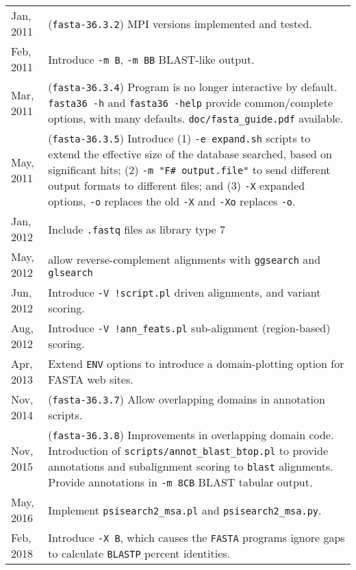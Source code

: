 \begin{longtable}{p{0.75 in}p{5.25 in}}
Jan, 2011 & (\texttt{fasta-36.3.2}) MPI versions implemented and tested.\\[1ex]

Feb, 2011 & Introduce \texttt{-m B}, \texttt{-m BB} BLAST-like output.\\[1.0ex]

Mar, 2011 & (\texttt{fasta-36.3.4}) Program is no longer interactive by
default. \texttt{fasta36 -h} and \texttt{fasta36 -help} provide
common/complete options, with many defaults. \texttt{doc/fasta\_guide.pdf} available.\\[1.0ex]

May, 2011 & (\texttt{fasta-36.3.5}) Introduce (1) \texttt{-e
  expand.sh} scripts to extend the effective size of the database
searched, based on significant hits; (2) \texttt{-m "F\# output.file"}
to send different output formats to different files; and (3)
\texttt{-X} expanded options, \texttt{-o} replaces the old \texttt{-X}
and \texttt{-Xo} replaces \texttt{-o}. \\[1.0ex]

Jan, 2012 & Include \texttt{.fastq} files as library type 7 \\[1.0ex]

May, 2012 & allow reverse-complement alignments with \texttt{ggsearch} and \texttt{glsearch} \\[1.0ex]

Jun, 2012 & Introduce \texttt{-V !script.pl} driven alignments, and variant scoring.\\[1.0ex]

Aug, 2012 & Introduce \texttt{-V !ann\_feats.pl} sub-alignment (region-based) scoring.\\[1.0ex]

Apr, 2013 & Extend \texttt{ENV} options to introduce a domain-plotting option for FASTA web sites.\\[1.0ex]

Nov, 2014 & (\texttt{fasta-36.3.7}) Allow overlapping domains in annotation scripts.\\[1.0ex]

Nov, 2015 & (\texttt{fasta-36.3.8}) Improvements in overlapping domain
code. Introduction of \texttt{scripts/annot\_blast\_btop.pl} to
provide annotations and subalignment scoring to \texttt{blast}
alignments.  Provide annotations in \texttt{-m 8CB} BLAST tabular
output. \\[1.0ex]
       
May, 2016 & Implement \texttt{psisearch2\_msa.pl} and \texttt{psisearch2\_msa.py}.\\[1.0ex]

Feb, 2018 & Introduce \texttt{-X B}, which causes the \texttt{FASTA}
programs ignore gaps to calculate \texttt{BLASTP} percent
identities.\\[1.0ex]

\hline
\end{longtable}

